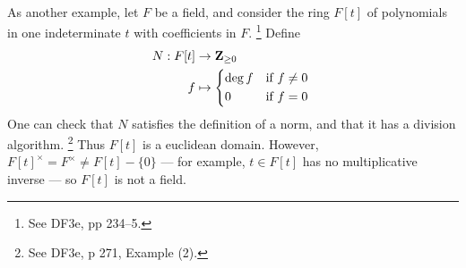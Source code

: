 \documentclass[oneside, english, 11pt]{article}
\newcommand{\integers}{\mathbf{Z}}
\newcommand{\integersNonnegative}{\integers_{\geq 0}}
\renewcommand{\setminus}{-}
\begin{document}
{As another example, let $F$ be a field, and consider the ring $F[t]$ of polynomials in one indeterminate $t$ with coefficients in $F$.%
\footnote{See DF3e, pp 234--5.} %
Define
\begin{align*}
N : F[t]
&\rightarrow
\integersNonnegative
\\
f
&\mapsto
\begin{dcases*}
\deg f	&	if $f \neq 0$	\\
0			&	if $f = 0$
\end{dcases*}
\end{align*}
One can check that $N$ satisfies the definition of a norm, and that it has a division algorithm.%
\footnote{See DF3e, p 271, Example (2).} %
Thus $F[t]$ is a euclidean domain. However, $F[t]^{\times} = F^{\times} \neq F[t] \setminus \{0\}$ --- for example, $t \in F[t]$ has no multiplicative inverse --- so $F[t]$ is not a field.%
}%
\end{document}
